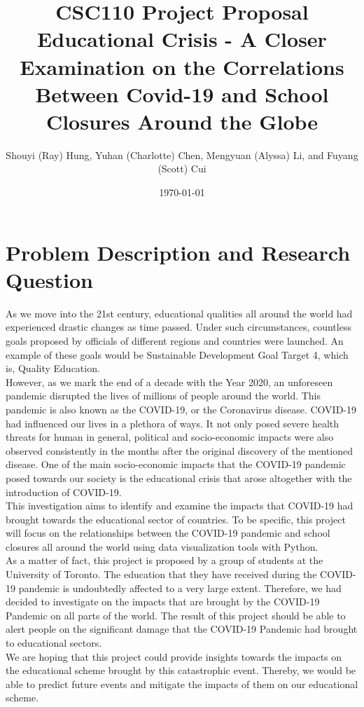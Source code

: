 \documentclass[fontsize=11pt]{article}
\title{CSC110 Project Proposal\\ Educational Crisis - A Closer Examination on the Correlations Between Covid-19 and School Closures Around the Globe}
\author{Shouyi (Ray) Hung, Yuhan (Charlotte) Chen, Mengyuan (Alyssa) Li, and Fuyang (Scott) Cui}
\date{\today}
\begin{document}
\maketitle

\section*{Problem Description and Research Question}

As we move into the 21st century, educational qualities all around the world had experienced drastic changes as time passed. Under such circumstances, countless goals proposed by officials of different regions and countries were launched. An example of these goals would be Sustainable Development Goal Target 4, which is, Quality Education. \\


However, as we mark the end of a decade with the Year 2020, an unforeseen pandemic disrupted the lives of millions of people around the world. This pandemic is also known as the COVID-19, or the Coronavirus disease. COVID-19 had influenced our lives in a plethora of ways. It not only posed severe health threats for human in general, political and socio-economic impacts were also observed consistently in the months after the original discovery of the mentioned disease. One of the main socio-economic impacts that the COVID-19 pandemic posed towards our society is the educational crisis that arose altogether with the introduction of COVID-19. \\


This investigation aims to identify and examine the impacts that COVID-19 had brought towards the educational sector of countries. To be specific, this project will focus on the relationships between the COVID-19 pandemic and school closures all around the world using data visualization tools with Python.\\


As a matter of fact, this project is proposed by a group of students at the University of Toronto. The education that they have received during the COVID-19 pandemic is undoubtedly affected to a very large extent. Therefore, we had decided to investigate on the impacts that are brought by the COVID-19 Pandemic on all parts of the world. The result of this project should be able to alert people on the significant damage that the COVID-19 Pandemic had brought to educational sectors. \\


We are hoping that this project could provide insights towards the impacts on the educational scheme brought by this catastrophic event. Thereby, we would be able to predict future events and mitigate the impacts of them on our educational scheme. 
\newpage
\end{document}
